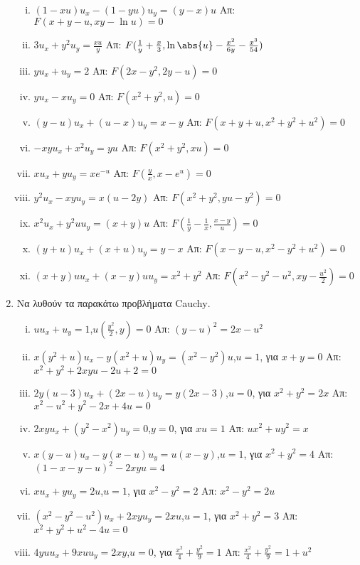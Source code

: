 \begin{enumerate}
 \begin{enumerate}[i)]
   \item $(1-xu)u_{x}-(1-yu)u_{y}=(y-x)u$ \hfill Απ: $F(x+y-u,xy-\ln u)=0$
   \item $3u_{x}+y^{2}u_{y}=\frac{xu}{y}$ \hfill Απ: $F(\frac{1}{y}+\frac{x}{3},\ln\abs{u}-\frac{x^{2}}{6y}-\frac{x^{3}}{54})$
   \item $yu_{x}+u_{y}=2$ \hfill Απ: $F(2x-y^{2},2y-u)=0$
   \item $yu_{x}-xu_{y}=0$ \hfill Απ: $F(x^{2}+y^{2},u)=0$
   \item $(y-u)u_{x}+(u-x)u_{y}=x-y$ \hfill Απ: $F(x+y+u,x^{2}+y^{2}+u^{2})=0$
   \item $-xyu_{x}+x^{2}u_{y}=yu$ \hfill Απ: $F(x^{2}+y^{2},xu)=0$
   \item $xu_{x}+yu_{y}=xe^{-u}$ \hfill Απ: $F(\frac{y}{x},x-e^{u})=0$
   \item $y^{2}u_{x}-xyu_{y}=x(u-2y)$ \hfill Απ: $F(x^{2}+y^{2},yu-y^{2})=0$
   \item $x^{2}u_{x}+y^{2}uu_{y}=(x+y)u$ \hfill Απ: $F(\frac{1}{y}-\frac{1}{x},\frac{x-y}{u})=0$
   \item $(y+u)u_{x}+(x+u)u_{y}=y-x$ \hfill Απ: $F(x-y-u,x^{2}-y^{2}+u^{2})=0$
   \item $(x+y)uu_{x}+(x-y)uu_{y}=x^{2}+y^{2}$ \hfill Απ: $F(x^{2}-y^{2}-u^{2},xy-\frac{u^{2}}{2})=0$




 \end{enumerate}

 \item Να λυθούν τα παρακάτω προβλήματα \textlatin{Cauchy}.

 \begin{enumerate}[i)]
   \item $uu_{x}+u_{y}=1$,\quad $u(\frac{y^{2}}{2},y)=0$ \hfill Απ: $(y-u)^{2}=2x-u^{2}$
   \item $x(y^{2}+u)u_{x}-y(x^{2}+u)u_{y}=(x^{2}-y^{2})u$,\quad $u=1$, για $x+y=0$ \hfill Απ: $x^{2}+y^{2}+2xyu-2u+2=0$
   \item $2y(u-3)u_{x}+(2x-u)u_{y}=y(2x-3)$,\quad $u=0$, για  $x^{2}+y^{2}=2x$ \hfill Απ: $x^{2}-u^{2}+y^{2}-2x+4u=0$
   \item $2xyu_{x}+(y^{2}-x^{2})u_{y}=0$,\quad $y=0$, για $xu=1$ \hfill Απ: $ux^{2}+uy^{2}=x$
   \item $x(y-u)u_{x}-y(x-u)u_{y}=u(x-y)$,\quad $u=1$, για $x^{2}+y^{2}=4$ \hfill Απ: $(1-x-y-u)^{2}-2xyu=4$
   \item $xu_{x}+yu_{y}=2u$,\quad $u=1$, για $x^{2}-y^{2}=2$ \hfill Απ: $x^{2}-y^{2}=2u$
   \item $(x^{2}-y^{2}-u^{2})u_{x}+2xyu_{y}=2xu$,\quad $u=1$, για $x^{2}+y^{2}=3$ \hfill Απ: $x^{2}+y^{2}+u^{2}-4u=0$
   \item $4yuu_{x}+9xuu_{y}=2xy$,\quad $u=0$, για $\frac{x^{2}}{4}+\frac{y^{2}}{9}=1$ \hfill Απ: $\frac{x^{2}}{4}+\frac{y^{2}}{9}=1+u^{2}$
 \end{enumerate}


\end{enumerate}
